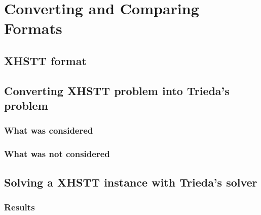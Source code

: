 \chapter{Converting and Comparing Formats}
\label{chap:converting}



\section{XHSTT format}



\section{Converting XHSTT problem into Trieda's problem}

\subsection{What was considered}

\subsection{What was not considered}



\section{Solving a XHSTT instance with Trieda's solver}

\subsection{Results}



